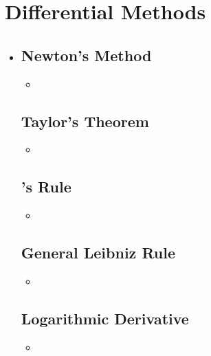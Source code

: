 \section{Differential Methods}
\begin{itemize}
  \item []
  
  \subsection{Newton's Method}
  \begin{itemize}
    \item 
  \end{itemize}

  \subsection{Taylor's Theorem}
  \begin{itemize}
    \item 
  \end{itemize}

  \subsection{\hopital's Rule}
  \begin{itemize}
    \item 
  \end{itemize}
  
  \subsection{General Leibniz Rule}
  \begin{itemize}
    \item 
  \end{itemize}
  
  \subsection{Logarithmic Derivative}
  \begin{itemize}
    \item 
  \end{itemize}
  
\end{itemize}